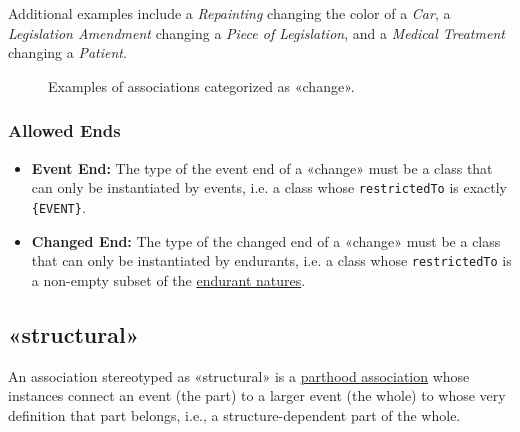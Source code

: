 Additional examples include a \textit{Repainting} changing the color of a \textit{Car}, a \textit{Legislation Amendment} changing a \textit{Piece of Legislation}, and a \textit{Medical Treatment} changing a \textit{Patient}.

\begin{figure}[h]
    \centering
    
    \caption{Examples of associations categorized as «change».}
    \label{fig:change-example}
\end{figure}
 
\subsubsection{Allowed Ends}
 
\begin{itemize}
    \item \textbf{Event End:} The type of the event end of a «change» must be a class that can only be instantiated by events, i.e. a class whose \texttt{restrictedTo} is exactly \texttt{\{EVENT\}}.
    \item \textbf{Changed End:} The type of the changed end of a «change» must be a class that can only be instantiated by endurants, i.e. a class whose \texttt{restrictedTo} is a non-empty subset of the \hyperref[par:endurant-nature]{endurant natures}.
\end{itemize}
 
 
 

\subsection{«structural»}
\label{stereotype:structural}

An association stereotyped as «structural» is a \hyperref[stereotype:parthood]{parthood association} whose instances connect an event (the part) to a larger event (the whole) to whose very definition that part belongs, i.e., a structure-dependent part of the whole.

